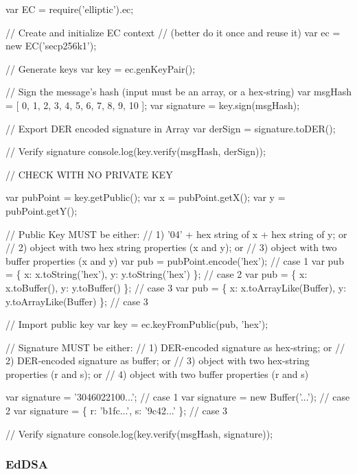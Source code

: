 \begin{DoxyCode}
var EC = require('elliptic').ec;

// Create and initialize EC context
// (better do it once and reuse it)
var ec = new EC('secp256k1');

// Generate keys
var key = ec.genKeyPair();

// Sign the message's hash (input must be an array, or a hex-string)
var msgHash = [ 0, 1, 2, 3, 4, 5, 6, 7, 8, 9, 10 ];
var signature = key.sign(msgHash);

// Export DER encoded signature in Array
var derSign = signature.toDER();

// Verify signature
console.log(key.verify(msgHash, derSign));

// CHECK WITH NO PRIVATE KEY

var pubPoint = key.getPublic();
var x = pubPoint.getX();
var y = pubPoint.getY();

// Public Key MUST be either:
// 1) '04' + hex string of x + hex string of y; or
// 2) object with two hex string properties (x and y); or
// 3) object with two buffer properties (x and y)
var pub = pubPoint.encode('hex');                                 // case 1
var pub = \{ x: x.toString('hex'), y: y.toString('hex') \};         // case 2
var pub = \{ x: x.toBuffer(), y: y.toBuffer() \};                   // case 3
var pub = \{ x: x.toArrayLike(Buffer), y: y.toArrayLike(Buffer) \}; // case 3

// Import public key
var key = ec.keyFromPublic(pub, 'hex');

// Signature MUST be either:
// 1) DER-encoded signature as hex-string; or
// 2) DER-encoded signature as buffer; or
// 3) object with two hex-string properties (r and s); or
// 4) object with two buffer properties (r and s)

var signature = '3046022100...'; // case 1
var signature = new Buffer('...'); // case 2
var signature = \{ r: 'b1fc...', s: '9c42...' \}; // case 3

// Verify signature
console.log(key.verify(msgHash, signature));
\end{DoxyCode}


\subsubsection*{Ed\+D\+SA}



